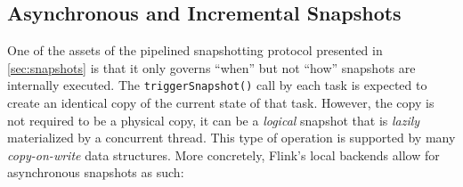

\subsection{Asynchronous and Incremental Snapshots}
\label{sec:async}
One of the assets of the pipelined snapshotting protocol presented in \autoref{sec:snapshots} is that it only governs ``when'' but not ``how'' snapshots are internally executed. The \texttt{triggerSnapshot()} call by each task is expected to create an identical copy of the current state of that task. However, the copy is not required to be a physical copy, it can be a \emph{logical} snapshot that is \emph{lazily} materialized by a concurrent thread. This type of operation is supported by many \emph{copy-on-write} data structures. More concretely, Flink's local backends allow for asynchronous snapshots as such:

